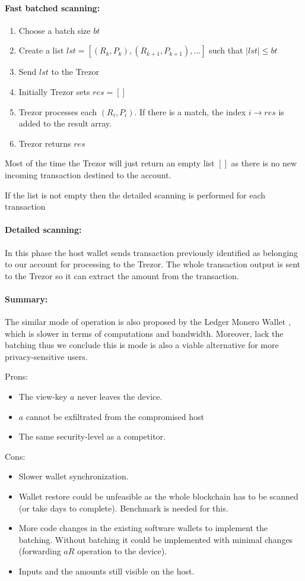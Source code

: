 \documentclass[]{article}
\begin{document}
\paragraph{Fast batched scanning:}
\begin{enumerate}
	\item Choose a batch size $bt$
	\item Create a list $lst = [(R_k, P_k), (R_{k+1}, P_{k+1}), ...]$ such that $|lst| \leq bt$
	\item Send $lst$ to the Trezor
	\item Initially Trezor sets $res = []$
	\item Trezor processes each $(R_i, P_i)$. If there is a match, the index $i \rightarrow res$ is added to the result array.
	\item Trezor returns $res$ 
\end{enumerate}
Most of the time the Trezor will just return an empty list $[]$ as there is no new incoming transaction destined to the account. 

If the list is not empty then the detailed scanning is performed for each transaction

\paragraph{Detailed scanning:} In this phase the host wallet sends transaction previously identified as belonging to our account for processing to the Trezor. The whole transaction output is sent to the Trezor so it can extract the amount from the transaction.

\paragraph{Summary:}
The similar mode of operation is also proposed by the Ledger Monero Wallet \cite{ledger_doc}, which is slower in terms of computations and bandwidth. Moreover, lack the batching thus we conclude this is mode is also a viable alternative for more privacy-sensitive users.

\noindent Prons:
\begin{itemize}
	\item The view-key $a$ never leaves the device.
	\item $a$ cannot be exfiltrated from the compromised host
	\item The same security-level as a competitor.
\end{itemize}

\noindent Cons:
\begin{itemize}
	\item Slower wallet synchronization.
	\item Wallet restore could be unfeasible as the whole blockchain has to be scanned (or take days to complete). Benchmark is needed for this.
	\item More code changes in the existing software wallets to implement the batching. Without batching it could be implemented with minimal changes (forwarding $aR$ operation to the device).
	\item Inputs and the amounts still visible on the host.
\end{itemize}
\end{document}
